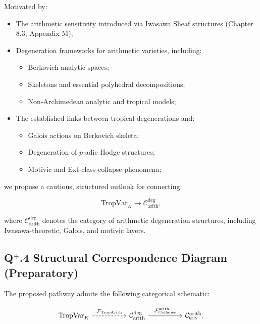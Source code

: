 \documentclass[11pt]{article}
\begin{document}
Motivated by:

\begin{itemize}
    \item The arithmetic sensitivity introduced via Iwasawa Sheaf structures (Chapter 8.3, Appendix M);
    \item Degeneration frameworks for arithmetic varieties, including:
    \begin{itemize}
        \item Berkovich analytic spaces;
        \item Skeletons and essential polyhedral decompositions;
        \item Non-Archimedean analytic and tropical models;
    \end{itemize}
    \item The established links between tropical degenerations and:
    \begin{itemize}
        \item Galois actions on Berkovich skeleta;
        \item Degeneration of $p$-adic Hodge structures;
        \item Motivic and Ext-class collapse phenomena;
    \end{itemize}
\end{itemize}

we propose a cautious, structured outlook for connecting:

\[
\mathrm{TropVar}_K \longrightarrow \mathcal{C}_{\mathrm{arith}}^{\mathrm{deg}},
\]

where $\mathcal{C}_{\mathrm{arith}}^{\mathrm{deg}}$ denotes the category of arithmetic degeneration structures, including Iwasawa-theoretic, Galois, and motivic layers.

\subsection*{Q$^{+}$.4 Structural Correspondence Diagram (Preparatory)}

The proposed pathway admits the following categorical schematic:

\[
\begin{tikzcd}[column sep=huge, row sep=large]
\mathrm{TropVar}_K \arrow[r, dashed, "\mathcal{F}_{\mathrm{TropArith}}"] 
& \mathcal{C}_{\mathrm{arith}}^{\mathrm{deg}} \arrow[r, "\mathcal{F}_{\mathrm{Collapse}}^{\mathrm{arith}}"]
& \mathcal{C}_{\mathrm{triv}}^{\mathrm{arith}}.
\end{tikzcd}
\]
\end{document}
